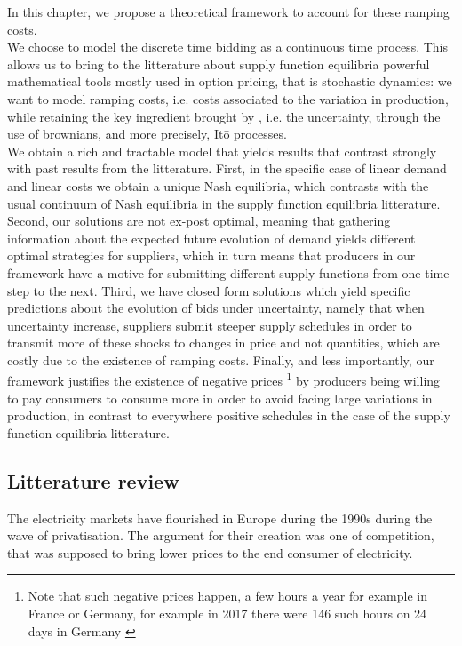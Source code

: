 In this chapter, we propose a theoretical framework to account for these ramping costs.\\

We choose to model the discrete time bidding as a continuous time process. This allows us to bring to the litterature about supply function equilibria powerful mathematical tools mostly used in option pricing, that is stochastic dynamics: we want to model ramping costs, i.e. costs associated to the variation in production, while retaining the key ingredient brought by \cite{KM}, i.e. the uncertainty, through the use of brownians, and more precisely, It\={o} processes. \\

We obtain a rich and tractable model that yields results that contrast strongly with past results from the litterature. First, in the specific case of linear demand and linear costs we obtain a unique Nash equilibria, which contrasts with the usual continuum of Nash equilibria in the supply function equilibria litterature. Second, our solutions are not ex-post optimal, meaning that gathering information about the expected future evolution of demand yields different optimal strategies for suppliers, which in turn means that producers in our framework have a motive for submitting different supply functions from one time step to the next. Third, we have closed form solutions which yield specific predictions about the evolution of bids under uncertainty, namely that when uncertainty increase, suppliers submit steeper supply schedules in order to transmit more of these shocks to changes in price and not quantities, which are costly due to the existence of ramping costs. Finally, and less importantly, our framework justifies the existence of negative prices \footnote{Note that such negative prices happen, a few hours a year for example in France or Germany, for example in 2017 there were 146 such hours on 24 days in Germany \cite{epexnegP}} by producers being willing to pay consumers to consume more in order to avoid facing large variations in production, in contrast to everywhere positive schedules in the case of the supply function equilibria litterature.\\

\subsection{Litterature review}
The electricity markets have flourished in Europe during the 1990s during the wave of privatisation. The argument for their creation was one of competition, that was supposed to bring lower prices to the end consumer of electricity.\\

